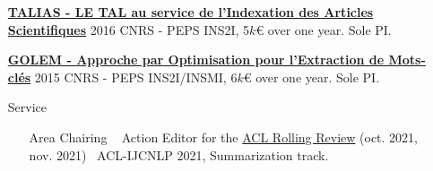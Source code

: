 \documentclass[11pt,a4paper]{article}
\begin{document}
\begin{itemize}
\href{http://boudinfl.github.io/talias/}{\textbf{TALIAS - LE TAL au service de
l'Indexation des Articles Scientifiques}} \hfill 2016 \newline
CNRS - PEPS INS2I, 5$k$\euro{} over one year. Sole PI.

\href{http://boudinfl.github.io/golem/}{\textbf{GOLEM - Approche par Optimisation
pour l'Extraction de Mots-clés}} \hfill 2015 \newline
CNRS - PEPS INS2I/INSMI, 6$k$\euro{} over one year. Sole PI.

\item[Service]
\begin{itemize}[
font=\normalfont\bfseries,
itemsep=.1cm,
wide=0cm,
labelsep*=.1cm]

\item[Area Chairing] ~\newline
%
Action Editor for the \href{https://aclrollingreview.org/}{ACL Rolling Review} (oct. 2021, nov. 2021)~\newline
ACL-IJCNLP 2021, Summarization track.~\newline



\end{itemize}
\end{itemize}
\end{document}
